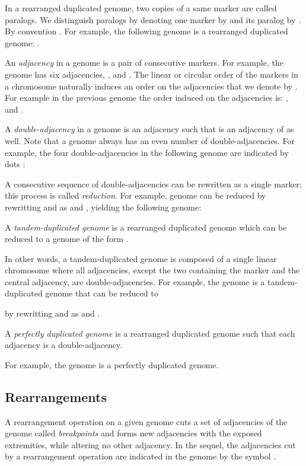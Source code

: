 \documentclass{llncs}
\begin{document}
In a rearranged duplicated genome, two copies of a same marker are called paralogs. We distinguish paralogs by denoting one marker by  and its paralog by . By convention .
For example, the following genome is a rearranged duplicated genome: 
.


An \emph{adjacency} in a genome is a pair of consecutive markers. 
For example, the genome  has six adjacencies, , and .
The linear 
or circular order of the markers in a chromosome naturally induces an order 
on the adjacencies that we denote by . For example in the previous genome 
the order induced on the adjacencies is:
 , and .


A \emph{double-adjacency} in a genome  is an adjacency 
such that   is an adjacency of  as well. Note that a genome always has an even number of double-adjacencies.
For example, the four double-adjacencies in the following genome are indicated by dots :


A consecutive sequence of double-adjacencies can be rewritten as a single marker; this process is called \emph{reduction}. For example, genome  can be reduced by rewritting  and  as  and , yielding the following genome:


\begin{definition}
A \emph{tandem-duplicated genome} is a rearranged duplicated genome which can be reduced to a genome of the form .
\end{definition}

In other words, a tandem-duplicated genome is composed of a single linear chromosome where all adjacencies, except the two containing the marker  and the central adjacency, are double-adjacencies.
For example, the genome  is a tandem-duplicated genome that can be reduced to 

by rewritting  and  as   and .



\begin{definition}
A \emph{perfectly duplicated genome} is a rearranged duplicated genome such that each adjacency is a double-adjacency. 
\end{definition}


For example, the genome  is a perfectly duplicated genome.


\subsection*{Rearrangements}
\label{sec:rearrangement}

A rearrangement operation on a given genome cuts a set of adjacencies of the 
genome called \emph{breakpoints} and forms new adjacencies with the exposed 
extremities, while altering no other adjacency. In the sequel, the adjacencies 
cut by a rearrangement operation are indicated in the genome by the symbol . 
  
\end{document}
